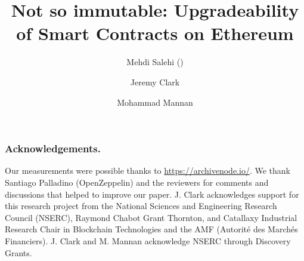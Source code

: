 \documentclass[envcountsect]{llncs}
\begin{document}
\frontmatter
\mainmatter

\title{Not so immutable: Upgradeability of Smart Contracts on Ethereum}

\author{Mehdi Salehi (\Letter) \and Jeremy Clark \and Mohammad Mannan}
 
\maketitle







%
%



\subsubsection*{Acknowledgements.} Our measurements were possible thanks to \url{https://archivenode.io/}. We thank Santiago Palladino (OpenZeppelin) and the reviewers for comments and discussions that helped to improve our paper. J. Clark acknowledges support for this research project from the National Sciences and Engineering Research Council (NSERC), Raymond Chabot Grant Thornton, and Catallaxy Industrial Research Chair in Blockchain Technologies and the AMF (Autorité des Marchés Financiers). J. Clark and M. Mannan acknowledge NSERC through Discovery Grants. 







%


\end{document}
